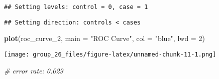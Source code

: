 \documentclass[
]{article}
\newenvironment{Shaded}{\begin{snugshade}}{\end{snugshade}}
\newcommand{\AttributeTok}[1]{\textcolor[rgb]{0.13,0.29,0.53}{#1}}
\newcommand{\CommentTok}[1]{\textcolor[rgb]{0.56,0.35,0.01}{\textit{#1}}}
\newcommand{\DecValTok}[1]{\textcolor[rgb]{0.00,0.00,0.81}{#1}}
\newcommand{\FunctionTok}[1]{\textcolor[rgb]{0.13,0.29,0.53}{\textbf{#1}}}
\newcommand{\NormalTok}[1]{#1}
\newcommand{\OtherTok}[1]{\textcolor[rgb]{0.56,0.35,0.01}{#1}}
\newcommand{\SpecialCharTok}[1]{\textcolor[rgb]{0.81,0.36,0.00}{\textbf{#1}}}
\newcommand{\StringTok}[1]{\textcolor[rgb]{0.31,0.60,0.02}{#1}}
\begin{document}
\begin{Shaded}
\end{Shaded}

\begin{verbatim}
## Setting levels: control = 0, case = 1
\end{verbatim}

\begin{verbatim}
## Setting direction: controls < cases
\end{verbatim}

\begin{Shaded}
\begin{Highlighting}[]
\FunctionTok{plot}\NormalTok{(roc\_curve\_2, }\AttributeTok{main =} \StringTok{"ROC Curve"}\NormalTok{, }\AttributeTok{col =} \StringTok{"blue"}\NormalTok{, }\AttributeTok{lwd =} \DecValTok{2}\NormalTok{)}
\end{Highlighting}
\end{Shaded}

\texttt{[image: group\_26\_files/figure-latex/unnamed-chunk-11-1.png]}

\begin{Shaded}
\begin{Highlighting}[]
\CommentTok{\# error rate: 0.029}
\end{Highlighting}
\end{Shaded}
\end{document}
